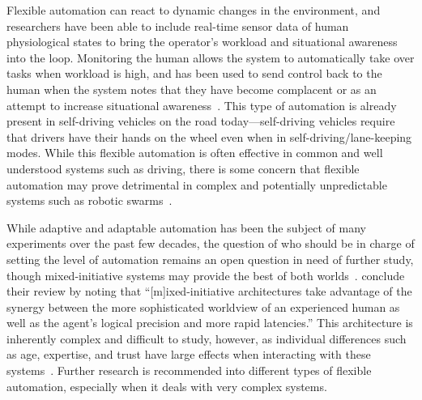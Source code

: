 Flexible automation can react to dynamic changes in the environment, and researchers have been able to include real-time sensor data of human physiological states to bring the operator's workload and situational awareness into the loop.
Monitoring the human allows the system to automatically take over tasks when workload is high, and has been used to send control back to the human when the system notes that they have become complacent or as an attempt to increase situational awareness~\citep{lu_human_2016}.
This type of automation is already present in self-driving vehicles on the road today—self-driving vehicles require that drivers have their hands on the wheel even when in self-driving/lane-keeping modes.
While this flexible automation is often effective in common and well understood systems such as driving, there is some concern that flexible automation may prove detrimental in complex and potentially unpredictable systems such as robotic swarms~\citep{kolling_human_2016}.

While adaptive and adaptable automation has been the subject of many experiments over the past few decades, the question of who should be in charge of setting the level of automation remains an open question in need of further study, though mixed-initiative systems may provide the best of both worlds~\citep{chen_humanagent_2014, parasuraman_humans:_2008}.
\citeauthor{chen_humanagent_2014} conclude their review by noting that ``[m]ixed-initiative architectures take advantage of the synergy between the more sophisticated worldview of an experienced human as well as the agent's logical precision and more rapid latencies.''
This architecture is inherently complex and difficult to study, however, as individual differences such as age, expertise, and trust have large effects when interacting with these systems~\citep{schaefer_meta-analysis_2016}.
Further research is recommended into different types of flexible automation, especially when it deals with very complex systems.

